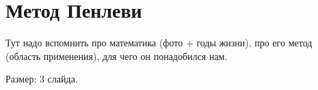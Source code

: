 \section{Метод Пенлеви}

Тут надо вспомнить про математика (фото + годы жизни), про его метод (область применения), для чего он понадобился нам.

Размер: 3 слайда.
